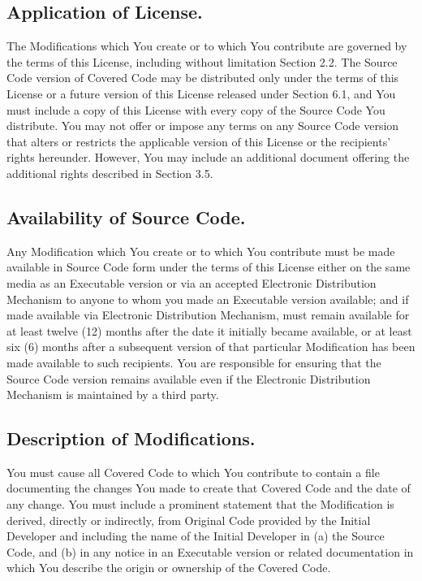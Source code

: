 \documentclass[letterpaper,colorlinks=true,linkcolor=blue]{book}
\begin{document}
\subsection{Application of License.}
The Modifications which You create or to which You contribute are governed by the terms of this License, including without limitation Section 2.2. The Source Code version of Covered Code may be distributed only under the terms of this License or a future version of this License released under Section 6.1, and You must include a copy of this License with every copy of the Source Code You distribute. You may not offer or impose any terms on any Source Code version that alters or restricts the applicable version of this License or the recipients' rights hereunder. However, You may include an additional document offering the additional rights described in Section 3.5. 

\subsection{Availability of Source Code.}
Any Modification which You create or to which You contribute must be made available in Source Code form under the terms of this License either on the same media as an Executable version or via an accepted Electronic Distribution Mechanism to anyone to whom you made an Executable version available; and if made available via Electronic Distribution Mechanism, must remain available for at least twelve (12) months after the date it initially became available, or at least six (6) months after a subsequent version of that particular Modification has been made available to such recipients. You are responsible for ensuring that the Source Code version remains available even if the Electronic Distribution Mechanism is maintained by a third party. 

\subsection{Description of Modifications.}
You must cause all Covered Code to which You contribute to contain a file documenting the changes You made to create that Covered Code and the date of any change. You must include a prominent statement that the Modification is derived, directly or indirectly, from Original Code provided by the Initial Developer and including the name of the Initial Developer in (a) the Source Code, and (b) in any notice in an Executable version or related documentation in which You describe the origin or ownership of the Covered Code. 
\end{document}
